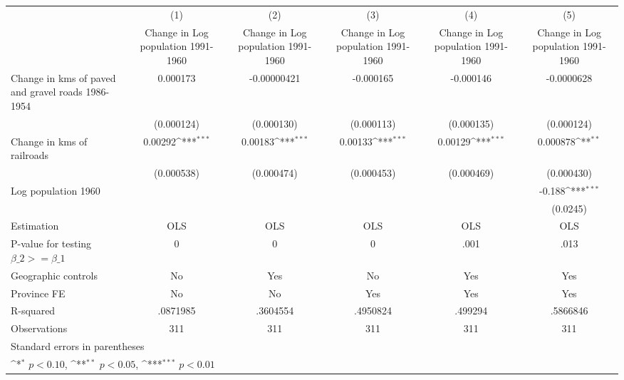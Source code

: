 {
\def\sym#1{\ifmmode^{#1}\else\(^{#1}\)\fi}
\begin{tabular}{l*{5}{c}}
\hline\hline
                    &\multicolumn{1}{c}{(1)}&\multicolumn{1}{c}{(2)}&\multicolumn{1}{c}{(3)}&\multicolumn{1}{c}{(4)}&\multicolumn{1}{c}{(5)}\\
                    &\multicolumn{1}{c}{Change in Log population 1991-1960}&\multicolumn{1}{c}{Change in Log population 1991-1960}&\multicolumn{1}{c}{Change in Log population 1991-1960}&\multicolumn{1}{c}{Change in Log population 1991-1960}&\multicolumn{1}{c}{Change in Log population 1991-1960}\\
\hline
Change in kms of paved and gravel roads 1986-1954&    0.000173         & -0.00000421         &   -0.000165         &   -0.000146         &  -0.0000628         \\
                    &  (0.000124)         &  (0.000130)         &  (0.000113)         &  (0.000135)         &  (0.000124)         \\
[1em]
Change in kms of railroads&     0.00292\sym{***}&     0.00183\sym{***}&     0.00133\sym{***}&     0.00129\sym{***}&    0.000878\sym{**} \\
                    &  (0.000538)         &  (0.000474)         &  (0.000453)         &  (0.000469)         &  (0.000430)         \\
[1em]
Log population 1960 &                     &                     &                     &                     &      -0.188\sym{***}\\
                    &                     &                     &                     &                     &    (0.0245)         \\
\hline
Estimation          &         OLS         &         OLS         &         OLS         &         OLS         &         OLS         \\
P-value for testing $\beta\_2 >= \beta\_1$&           0         &           0         &           0         &        .001         &        .013         \\
Geographic controls &          No         &         Yes         &          No         &         Yes         &         Yes         \\
Province FE         &          No         &          No         &         Yes         &         Yes         &         Yes         \\
R-squared           &    .0871985         &    .3604554         &    .4950824         &     .499294         &    .5866846         \\
Observations        &         311         &         311         &         311         &         311         &         311         \\
\hline\hline
\multicolumn{6}{l}{\footnotesize Standard errors in parentheses}\\
\multicolumn{6}{l}{\footnotesize \sym{*} \(p<0.10\), \sym{**} \(p<0.05\), \sym{***} \(p<0.01\)}\\
\end{tabular}
}
